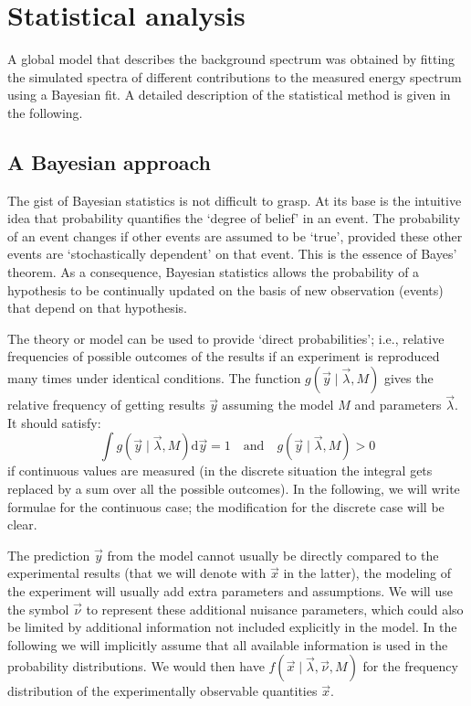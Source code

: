 \section{Statistical analysis}\label{sec:bayes}
A global model that describes the background spectrum was obtained by fitting the simulated spectra of different contributions to the measured energy spectrum using a Bayesian fit. A detailed description of the statistical method is given in the following.
\subsection*{A Bayesian approach}
The gist of Bayesian statistics is not difficult to grasp. At its base is the intuitive idea that probability quantifies the `degree of belief' in an event. The probability of an event changes if other events are assumed to be `true', provided these other events are `stochastically dependent' on that event. This is the essence of Bayes' theorem. As a consequence, Bayesian statistics allows the probability of a hypothesis to be continually updated on the basis of new observation (events) that depend on that hypothesis. 

 The theory or model can be used to provide `direct probabilities'; i.e., relative frequencies of possible outcomes of the results if an experiment is reproduced many times under identical conditions. The function $g(\vec{y}\mid\vec{\lambda},M)$ gives the relative frequency of getting results $\vec{y}$ assuming the model $M$ and parameters $\vec{\lambda}$. It should satisfy:
\begin{equation}\int g(\vec{y}\mid\vec{\lambda},M)\text{d}\vec{y}=1 \quad\text{and}\quad g(\vec{y}\mid\vec{\lambda},M)>0\end{equation}
if continuous values are measured (in the discrete situation the integral gets replaced by a sum over all the possible outcomes). In the following, we will write formulae for the continuous case; the modification for the discrete case will be clear.

The prediction $\vec{y}$ from the model cannot usually be directly compared to the experimental results (that we will denote with $\vec{x}$ in the latter), the modeling of the experiment will usually add extra parameters and assumptions. We will use the symbol $\vec{\nu}$ to represent these additional nuisance parameters, which could also be limited by additional information not included explicitly in the model. In the following we will implicitly assume that all available information is used in the probability distributions. We would then have $f(\vec{x}\mid\vec{\lambda},\vec{\nu},M)$ for the frequency distribution of the experimentally observable quantities $\vec{x}$.

